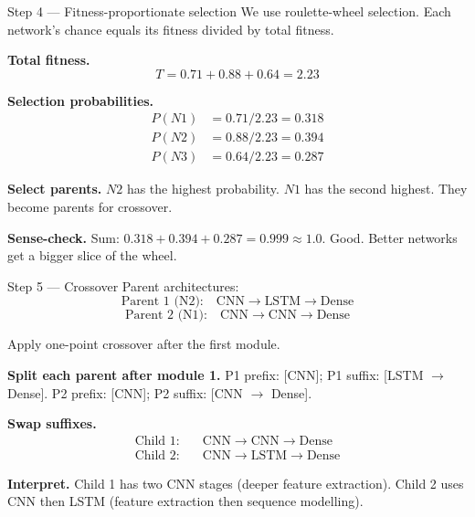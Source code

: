 \documentclass[a4paper,11pt]{article}
\begin{document}
\begin{worked}{Step 4 --- Fitness-proportionate selection}
We use roulette-wheel selection.
Each network's chance equals its fitness divided by total fitness.

\begin{steps}
  \item \textbf{Total fitness.}
        \[ T = 0.71 + 0.88 + 0.64 = 2.23 \]

  \item \textbf{Selection probabilities.}
        \begin{align*}
          P(N1) &= 0.71 / 2.23 = \mathbf{0.318} \\
          P(N2) &= 0.88 / 2.23 = \mathbf{0.394} \\
          P(N3) &= 0.64 / 2.23 = \mathbf{0.287}
        \end{align*}

  \item \textbf{Select parents.}
        $N2$ has the highest probability.
        $N1$ has the second highest.
        They become parents for crossover.

  \item \textbf{Sense-check.}
        Sum: $0.318 + 0.394 + 0.287 = 0.999 \approx 1.0$. Good.
        Better networks get a bigger slice of the wheel.
\end{steps}
\end{worked}

\begin{worked}{Step 5 --- Crossover}
Parent architectures:
\[
  \text{Parent 1 (N2):}\quad \text{CNN} \to \text{LSTM} \to \text{Dense}
\]
\[
  \text{Parent 2 (N1):}\quad \text{CNN} \to \text{CNN} \to \text{Dense}
\]

Apply one-point crossover after the first module.

\begin{steps}
  \item \textbf{Split each parent after module 1.}
        P1 prefix: [CNN]; P1 suffix: [LSTM $\to$ Dense].
        P2 prefix: [CNN]; P2 suffix: [CNN $\to$ Dense].

  \item \textbf{Swap suffixes.}
        \begin{align*}
          \text{Child 1:} & \quad \text{CNN} \to \text{CNN} \to \text{Dense} \\
          \text{Child 2:} & \quad \text{CNN} \to \text{LSTM} \to \text{Dense}
        \end{align*}

  \item \textbf{Interpret.}
        Child 1 has two CNN stages (deeper feature extraction).
        Child 2 uses CNN then LSTM (feature extraction then sequence
        modelling).
\end{steps}
\end{worked}
\end{document}
